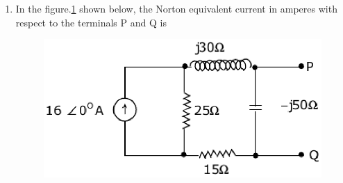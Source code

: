 \documentclass[journal,12pt,twocolumn]{IEEEtran}
\begin{document}
\begin{enumerate}
\item In the figure.\ref{fig80} shown below, the Norton equivalent current in amperes with respect
to the terminals P and Q is
\begin{enumerate}
\begin{figure}[!h]
\begin{center}
\includegraphics[scale=0.7]{./figs/fig80.eps}
\caption{}
\label{fig80}
\end{center}
\end{figure}
\end{enumerate}


\end{enumerate}
\end{document}
